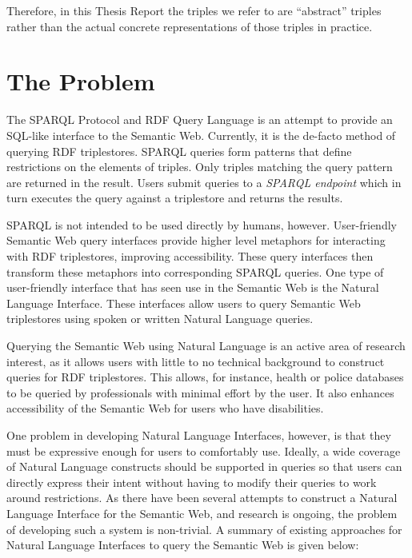 \documentclass[../main.tex]{subfiles}
\begin{document}
Therefore, in this Thesis Report the triples we refer to are ``abstract'' triples rather than the actual concrete representations of those triples in practice.


\section {The Problem}

The SPARQL Protocol and RDF Query Language is an attempt to provide an SQL-like interface to the Semantic Web.  Currently, it is the de-facto method of querying RDF triplestores.  SPARQL queries form patterns that define restrictions on the elements of triples.  Only triples matching the query pattern are returned in the result.  Users submit queries to a {\em SPARQL endpoint} which in turn executes the query against a triplestore and returns the results.

SPARQL is not intended to be used directly by humans, however. User-friendly Semantic Web query interfaces provide higher level metaphors for interacting with RDF triplestores, improving accessibility.  These query interfaces then transform these metaphors into corresponding SPARQL queries.  One type of user-friendly interface that has seen use in the Semantic Web is the Natural Language Interface.  These interfaces allow users to query Semantic Web triplestores using spoken or written Natural Language queries.

Querying the Semantic Web using Natural Language is an active area of research interest, as it allows users with little to no technical background to construct queries for RDF triplestores.  This allows, for instance, health or police databases to be queried by professionals with minimal effort by the user.  It also enhances accessibility of the Semantic Web for users who have disabilities.

One problem in developing Natural Language Interfaces, however, is that they must be expressive enough for users to comfortably use.  Ideally, a wide coverage of Natural Language constructs should be supported in queries so that users can directly express their intent without having to modify their queries to work around restrictions.  As there have been several attempts to construct a Natural Language Interface for the Semantic Web, and research is ongoing, the problem of developing such a system is non-trivial.  A summary of existing approaches for Natural Language Interfaces to query the Semantic Web is given below:
\end{document}
